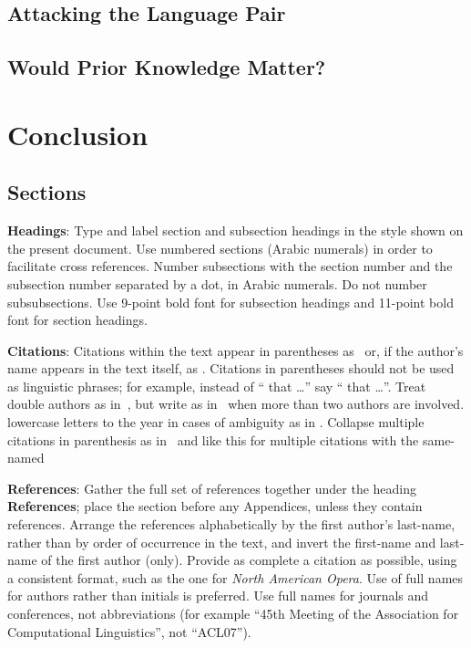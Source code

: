 \documentclass[]{article}
\begin{document}
\subsection{Attacking the Language Pair}
\label{sect:attack}

\subsection{Would Prior Knowledge Matter?}
\label{sect:prior}

\section{Conclusion}


\subsection{Sections}

{\bf Headings}: Type and label section and subsection headings in the
style shown on the present document.  Use numbered sections (Arabic
numerals) in order to facilitate cross references. Number subsections
with the section number and the subsection number separated by a dot,
in Arabic numerals. Do not number subsubsections. Use 9-point bold
font for subsection headings and 11-point bold font for section
headings.

{\bf Citations}: Citations within the text appear in parentheses
as~\citep{Smith} or, if the author's name appears in the text itself,
as \cite{Smith}. Citations in parentheses should not be used as
linguistic phrases; for example, instead of ``\citep{Smith}
 that \ldots'' say ``\cite{Smith} 
that \ldots''.  Treat double authors as in~\citep{DD15}, but write as
in~\citep{PDC} when more than two authors are involved.
 lowercase letters to the year in cases of ambiguity
as in \citep{JonesFirst}.  Collapse multiple citations in parenthesis
as in~\citep{Smith,JonesFirst} and like this for multiple citations
with the same-named 
\citep{Smith,SmithConc,JonesFirst,JonesSecond}

\textbf{References}: Gather the full set of references together under the
heading {\bf References}; place the section before any Appendices, unless they
contain references. Arrange the references alphabetically by the first
author's last-name, rather than by order of occurrence in the text, and invert
the first-name and last-name of the first author (only). Provide as complete
a citation as possible, using a consistent format, such as the one for {\em
North American Opera\/}.  Use of full names for
authors rather than initials is preferred.  Use full names for journals and
conferences, not abbreviations (for example ``45th Meeting of the Association
for Computational Linguistics'', not ``ACL07'').
\end{document}
